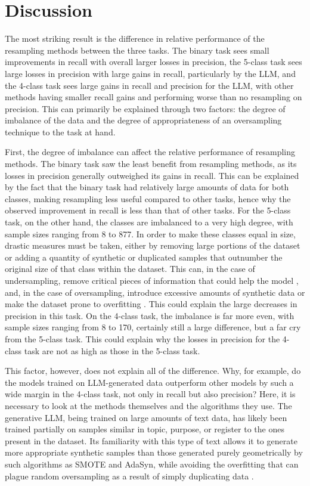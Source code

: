 \documentclass[runningheads]{llncs}
\begin{document}
\section{Discussion}
The most striking result is the difference in relative performance of the resampling methods between the three tasks. The binary task sees small improvements in recall with overall larger losses in precision, the 5-class task sees large losses in precision with large gains in recall, particularly by the LLM, and the 4-class task sees large gains in recall and precision for the LLM, with other methods having smaller recall gains and performing worse than no resampling on precision. This can primarily be explained through two factors: the degree of imbalance of the data and the degree of appropriateness of an oversampling technique to the task at hand.

First, the degree of imbalance can affect the relative performance of resampling methods. The binary task saw the least benefit from resampling methods, as its losses in precision generally outweighed its gains in recall. This can be explained by the fact that the binary task had relatively large amounts of data for both classes, making resampling less useful compared to other tasks, hence why the observed improvement in recall is less than that of other tasks. For the 5-class task, on the other hand, the classes are imbalanced to a very high degree, with sample sizes ranging from 8 to 877. In order to make these classes equal in size, drastic measures must be taken, either by removing large portions of the dataset or adding a quantity of synthetic or duplicated samples that outnumber the original size of that class within the dataset. This can, in the case of undersampling, remove critical pieces of information that could help the model \cite{marques} \cite{kraiem}, and, in the case of oversampling, introduce excessive amounts of synthetic data or make the dataset prone to overfitting \cite{marques} \cite{kraiem}. This could explain the large decreases in precision in this task. On the 4-class task, the imbalance is far more even, with sample sizes ranging from 8 to 170, certainly still a large difference, but a far cry from the 5-class task. This could explain why the losses in precision for the 4-class task are not as high as those in the 5-class task.

This factor, however, does not explain all of the difference. Why, for example, do the models trained on LLM-generated data outperform other models by such a wide margin in the 4-class task, not only in recall but also precision? Here, it is necessary to look at the methods themselves and the algorithms they use. The generative LLM, being trained on large amounts of text data, has likely been trained partially on samples similar in topic, purpose, or register to the ones present in the dataset. Its familiarity with this type of text allows it to generate more appropriate synthetic samples than those generated purely geometrically by such algorithms as SMOTE and AdaSyn, while avoiding the overfitting that can plague random oversampling as a result of simply duplicating data \cite{marques} \cite{kraiem}.
\end{document}
